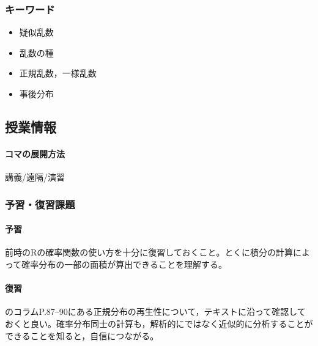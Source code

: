 \subsubsection{キーワード}
\begin{itemize}
	\item 疑似乱数
	\item 乱数の種
	\item 正規乱数，一様乱数
	\item 事後分布
\end{itemize}
\subsection{授業情報}
\paragraph{コマの展開方法}
講義/遠隔/演習
\subsubsection{予習・復習課題}
\paragraph{予習} 前時のRの確率関数の使い方を十分に復習しておくこと。とくに積分の計算によって確率分布の一部の面積が算出できることを理解する。
\paragraph{復習} \textcite{kosugi2023}のコラムP.87--90にある正規分布の再生性について，テキストに沿って確認しておくと良い。確率分布同士の計算も，解析的にではなく近似的に分析することができることを知ると，自信につながる。